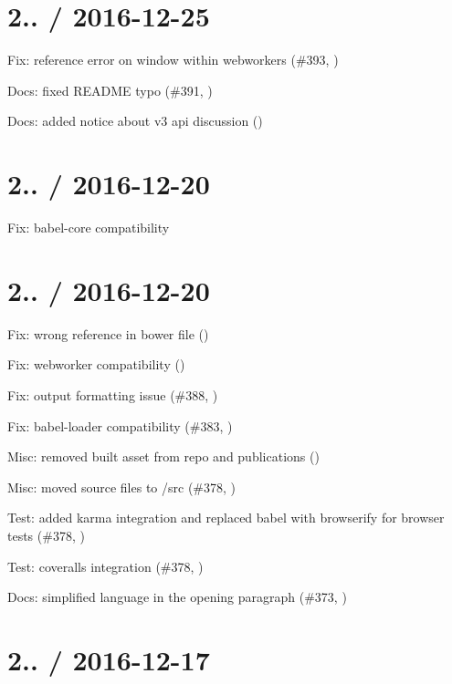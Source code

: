 \section*{2.. / 2016-\/12-\/25 }


\begin{DoxyItemize}
\item Fix\+: reference error on window within webworkers (\#393, )
\item Docs\+: fixed R\+E\+A\+D\+ME typo (\#391, )
\item Docs\+: added notice about v3 api discussion ()
\end{DoxyItemize}

\section*{2.. / 2016-\/12-\/20 }


\begin{DoxyItemize}
\item Fix\+: babel-\/core compatibility
\end{DoxyItemize}

\section*{2.. / 2016-\/12-\/20 }


\begin{DoxyItemize}
\item Fix\+: wrong reference in bower file ()
\item Fix\+: webworker compatibility ()
\item Fix\+: output formatting issue (\#388, )
\item Fix\+: babel-\/loader compatibility (\#383, )
\item Misc\+: removed built asset from repo and publications ()
\item Misc\+: moved source files to /src (\#378, )
\item Test\+: added karma integration and replaced babel with browserify for browser tests (\#378, )
\item Test\+: coveralls integration (\#378, )
\item Docs\+: simplified language in the opening paragraph (\#373, )
\end{DoxyItemize}

\section*{2.. / 2016-\/12-\/17 }


